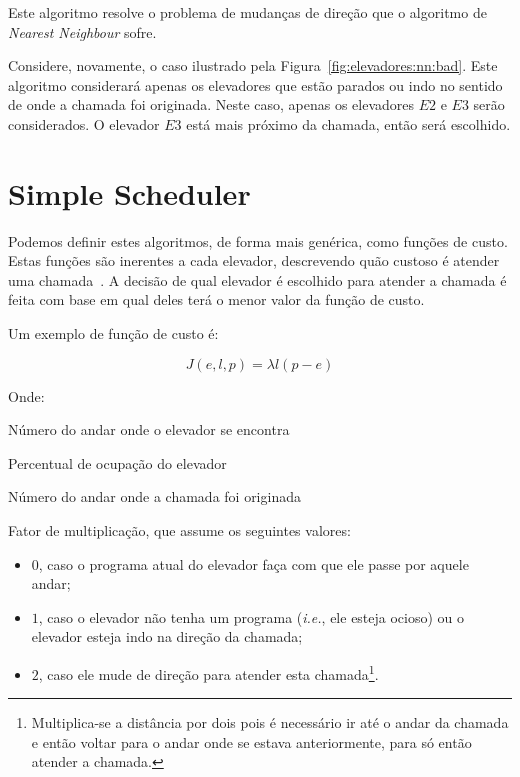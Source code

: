 Este algoritmo resolve o problema de mudanças de direção que o algoritmo de
\textit{Nearest Neighbour} sofre.

Considere, novamente, o caso ilustrado pela Figura~\ref{fig:elevadores:nn:bad}.
Este algoritmo considerará apenas os elevadores que estão parados ou indo no
sentido de onde a chamada foi originada. Neste caso, apenas os elevadores $E2$ e
$E3$ serão considerados. O elevador $E3$ está mais próximo da chamada, então
será escolhido.

\section{\label{sec:ai:minimize-cost-function}Simple Scheduler}

Podemos definir estes algoritmos, de forma mais genérica, como funções de custo.
Estas funções são inerentes a cada elevador, descrevendo quão custoso é
atender uma chamada~\cite{Friese20061908}. A decisão de qual elevador é
escolhido para atender a chamada é feita com base em qual deles terá o menor
valor da função de custo.


Um exemplo de função de custo é:

\[
  J(e, l, p) = \lambda l(p - e)
\]

Onde:
\begin{description}[leftmargin=!,labelwidth=\widthof{\bfseries Pu}]
\item[$\boldsymbol{e}$] Número do andar onde o elevador se encontra
\item[$\boldsymbol{l}$] Percentual de ocupação do elevador
\item[$\boldsymbol{p}$] Número do andar onde a chamada foi originada
\item[$\boldsymbol{\lambda}$] Fator de multiplicação, que assume os seguintes valores:
  \begin{itemize}
    \item $0$, caso o programa atual do elevador faça com que ele passe por
      aquele andar;
    \item $1$, caso o elevador não tenha um programa (\textit{i.e.},
      ele esteja ocioso) ou o elevador esteja indo na direção da chamada;
    \item $2$, caso ele mude de direção para atender esta chamada\footnote{Multiplica-se
        a distância por dois pois é necessário ir até o andar da chamada e então
        voltar para o andar onde se estava anteriormente, para só então atender
        a chamada.}.
  \end{itemize}
\end{description}

